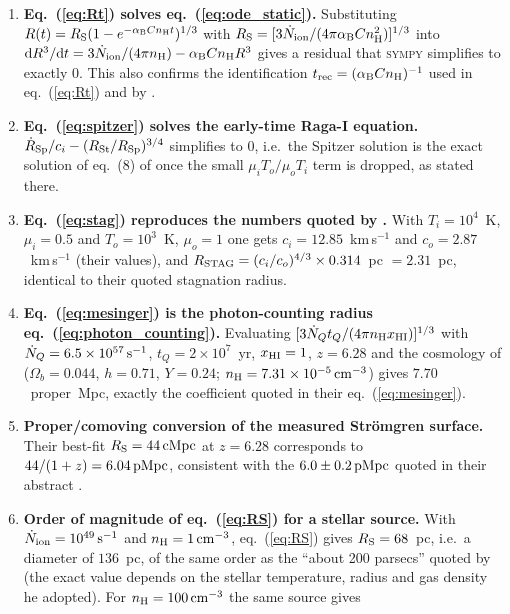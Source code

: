 \documentclass[11pt,a4paper]{article}
\newcommand{\Ndot}{\dot{N}_{\rm ion}}
\newcommand{\aB}{\alpha_{\rm B}}
\newcommand{\nH}{n_{\rm H}}
\newcommand{\pMpc}{\,{\rm pMpc}}
\newcommand{\cMpc}{\,{\rm cMpc}}
\begin{document}
\begin{enumerate}
\item \textbf{Eq.~(\ref{eq:Rt}) solves eq.~(\ref{eq:ode_static}).} Substituting
      $R(t)=R_{\rm S}(1-e^{-\aB C\nH t})^{1/3}$ with
      $R_{\rm S}=[3\Ndot/(4\pi\aB C\nH^2)]^{1/3}$ into
      ${\rm d}R^3/{\rm d}t=3\Ndot/(4\pi \nH)-\aB C\nH R^3$ gives a residual that \textsc{sympy}
      simplifies to exactly $0$. This also confirms the identification
      $t_{\rm rec}=(\aB C \nH)^{-1}$ used in eq.~(\ref{eq:Rt}) and by \citet{Shapiro2006}.
\item \textbf{Eq.~(\ref{eq:spitzer}) solves the early-time Raga-I equation.}
      $\dot R_{\rm Sp}/c_i-(R_{\rm St}/R_{\rm Sp})^{3/4}$ simplifies to $0$, i.e.\ the Spitzer
      solution is the exact solution of eq.~(8) of \citet{Bisbas2015} once the small
      $\mu_iT_o/\mu_oT_i$ term is dropped, as stated there.
\item \textbf{Eq.~(\ref{eq:stag}) reproduces the numbers quoted by \citet{Bisbas2015}.} With
      $T_i=10^4$~K, $\mu_i=0.5$ and $T_o=10^3$~K, $\mu_o=1$ one gets $c_i=12.85$~km\,s$^{-1}$ and
      $c_o=2.87$~km\,s$^{-1}$ (their values), and $R_{\rm STAG}=(c_i/c_o)^{4/3}\times0.314$~pc
      $=2.31$~pc, identical to their quoted stagnation radius.
\item \textbf{Eq.~(\ref{eq:mesinger}) is the photon-counting radius eq.~(\ref{eq:photon_counting}).}
      Evaluating $[3\dot N_Qt_Q/(4\pi \nH x_{\rm HI})]^{1/3}$ with
      $\dot N_Q=6.5\times10^{57}\,{\rm s^{-1}}$, $t_Q=2\times10^7$~yr, $x_{\rm HI}=1$, $z=6.28$ and
      the cosmology of \citet{Mesinger2004} ($\Omega_b=0.044$, $h=0.71$, $Y=0.24$;
      $\nH=7.31\times10^{-5}\,{\rm cm^{-3}}$) gives $7.70$~proper~Mpc, exactly the coefficient
      quoted in their eq.~(\ref{eq:mesinger}).
\item \textbf{Proper/comoving conversion of the measured Str\"omgren surface.} Their best-fit
      $R_{\rm S}=44\cMpc$ at $z=6.28$ corresponds to $44/(1+z)=6.04\pMpc$, consistent with the
      $6.0\pm0.2\pMpc$ quoted in their abstract \citep{Mesinger2004}.
\item \textbf{Order of magnitude of eq.~(\ref{eq:RS}) for a stellar source.} With
      $\Ndot=10^{49}\,{\rm s^{-1}}$ and $\nH=1\,{\rm cm^{-3}}$, eq.~(\ref{eq:RS}) gives
      $R_{\rm S}=68$~pc, i.e.\ a diameter of $136$~pc, of the same order as the ``about 200
      parsecs'' quoted by \citet{Stromgren1939} (the exact value depends on the stellar temperature,
      radius and gas density he adopted). For $\nH=100\,{\rm cm^{-3}}$ the same source gives

\end{enumerate}
\end{document}
